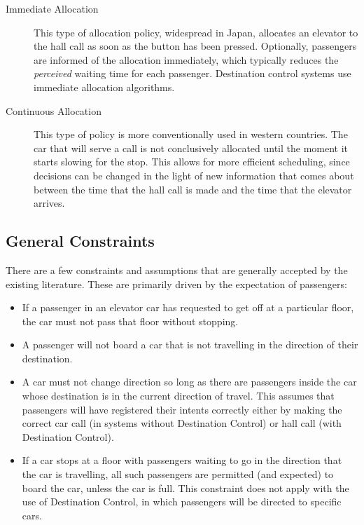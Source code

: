 \documentclass{UoYCSproject}
\begin{document}
\begin{description}
	\item[Immediate Allocation] This type of allocation policy, widespread in Japan, allocates an elevator to the hall call as soon as the button has been pressed.  Optionally, passengers are informed of the allocation immediately, which typically reduces the \textit{perceived} waiting time for each passenger.  Destination control systems use immediate allocation algorithms.
	\item[Continuous Allocation] This type of policy is more conventionally used in western countries.  The car that will serve a call is not conclusively allocated until the moment it starts slowing for the stop.  This allows for more efficient scheduling, since decisions can be changed in the light of new information that comes about between the time that the hall call is made and the time that the elevator arrives.
\end{description}

\subsection{General Constraints}

There are a few constraints and assumptions that are generally accepted by the existing literature.  These are primarily driven by the expectation of passengers:  \citep{Bao1994}

\begin{itemize}
	\item If a passenger in an elevator car has requested to get off at a particular floor, the car must not pass that floor without stopping.
	\item A passenger will not board a car that is not travelling in the direction of their destination.
	\item A car must not change direction so long as there are passengers inside the car whose destination is in the current direction of travel.  This assumes that passengers will have registered their intents correctly either by making the correct car call (in systems without Destination Control) or hall call (with Destination Control).
	\item If a car stops at a floor with passengers waiting to go in the direction that the car is travelling, all such passengers are permitted (and expected) to board the car, unless the car is full.  This constraint does not apply with the use of Destination Control, in which passengers will be directed to specific cars.
\end{itemize}
\end{document}
